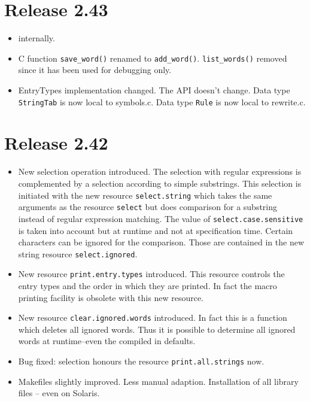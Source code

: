 \documentclass[11pt,a4paper]{scrartcl}
\newcommand\rsc[1]{\texttt{#1}}
\newcommand\File[1]{\textsf{#1}}
\newenvironment{Release}[2]{%
  \def\tmp{#2}%
  \section*{Release #1 \ifx\tmp\empty\else{\normalsize[#2]}\fi}
  \begin{itemize}
}{\end{itemize}}
\newenvironment{Fix}[1]{\item }{}
\newenvironment{New}[1]{\item }{}
\newenvironment{Update}[1]{\item }{}
\begin{document}
\begin{multicols}
\begin{Release}{2.43}{}
\begin{New}{gene}
    internally.
  \end{New}
  \begin{Update}{gene}
    C function \verb|save_word()| renamed to \verb|add_word()|.
    \verb|list_words()| removed since it has been used for debugging
    only.
  \end{Update}
  \begin{Update}{gene}
    EntryTypes implementation changed. The API doesn't change.
    Data type \verb|StringTab| is now local to \File{symbols.c}.
    Data type \verb|Rule| is now local to \File{rewrite.c}.
  \end{Update}
 \end{Release}

 \begin{Release}{2.42}{}
  \begin{New}{gene}
    New selection operation introduced. The selection with regular expressions
    is complemented by a selection according to simple substrings. This
    selection is initiated with the new resource \rsc{select.string}
    which takes the same arguments as the resource \rsc{select} but
    does comparison for a substring instead of regular expression matching.
    The value of \rsc{select.case.sensitive} is taken into account but
    at runtime and not at specification time. Certain characters can be
    ignored for the comparison. Those are contained in the new string resource
    \rsc{select.ignored}.
  \end{New}
  \begin{New}{gene}
    New resource \rsc{print.entry.types} introduced. This resource
    controls the entry types and the order in which they are printed.
    In fact the macro printing facility is obsolete with this new
    resource.
  \end{New}
  \begin{New}{gene}
    New resource \rsc{clear.ignored.words} introduced. In fact this is
    a function which deletes all ignored words. Thus it is possible to
    determine all ignored words at runtime--even the compiled in
    defaults.
  \end{New}
  \begin{Fix}{gene}
    Bug fixed: selection honours the resource \rsc{print.all.strings}
    now.
  \end{Fix}
  \begin{Update}{gene}
    Makefiles slightly improved. Less manual adaption. Installation of all
    library files -- even on Solaris.

\end{Update}
\end{Release}
\end{multicols}
\end{document}
